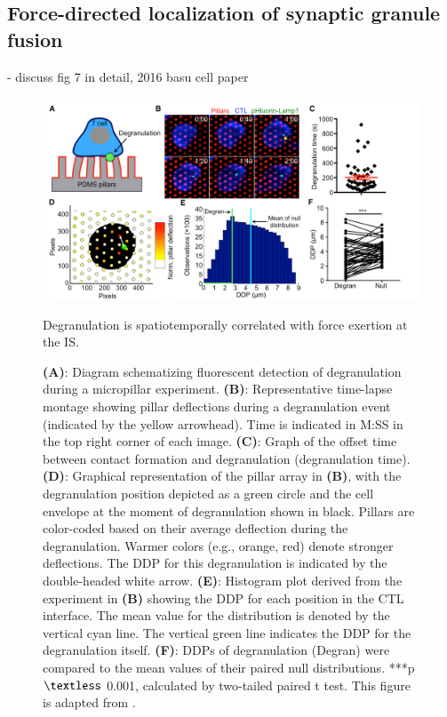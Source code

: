 \subsection{Force-directed localization of synaptic granule fusion}
- discuss fig 7 in detail, 2016 basu cell paper

\begin{figure}[htbp]
	\centering
	\includegraphics[width=\textwidth]{../figures/chapter3/introddp.png}
	\caption{Degranulation is spatiotemporally correlated with force exertion at the IS.}
	\caption*{\textbf{(A)}: Diagram schematizing fluorescent detection of degranulation during a micropillar experiment. \textbf{(B)}: Representative time-lapse montage showing pillar deflections during a degranulation event (indicated by the yellow arrowhead). Time is indicated in M:SS in the top right corner of each image. \textbf{(C)}: Graph of the offset time between contact formation and degranulation (degranulation time).  \textbf{(D)}: Graphical representation of the pillar array in \textbf{(B)}, with the degranulation position depicted as a green circle and the cell envelope at the moment of degranulation shown in black. Pillars are color-coded based on their average deflection during the degranulation. Warmer colors (e.g., orange, red) denote stronger deflections. The DDP for this degranulation is indicated by the double-headed white arrow. \textbf{(E)}: Histogram plot derived from the experiment in \textbf{(B)} showing the DDP for each position in the CTL interface. The mean value for the distribution is denoted by the vertical cyan line. The vertical green line indicates the DDP for the degranulation itself.  \textbf{(F)}: DDPs of degranulation (Degran) were compared to the mean values of their paired null distributions. ***p $\textless$ 0.001, calculated by two-tailed paired t test.  This figure is adapted from \cite{Basu2016}.}
	\label{fig:introddp}
\end{figure}

